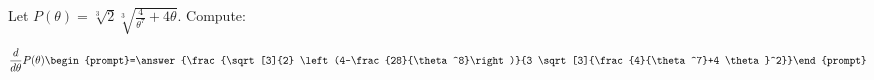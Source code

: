 \documentclass{ximera}
\author{Bart Snapp}
\begin{document}
\begin{exercise}
Let $P(\theta) = \sqrt[3]{2} \sqrt[3]{\frac{4}{\theta ^7}+4 \theta }$. Compute:

\[
\dd{\theta}P(\theta)
\begin{prompt}=\answer{\frac{\sqrt[3]{2} \left(4-\frac{28}{\theta ^8}\right)}{3 \sqrt[3]{\frac{4}{\theta ^7}+4 \theta }^2}}\end{prompt}
\]
\end{exercise}
\end{document}
